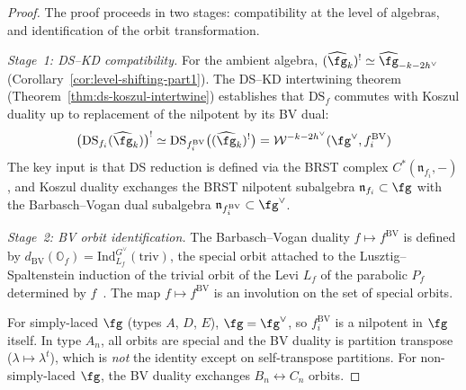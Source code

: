 \begin{proof}
The proof proceeds in two stages: compatibility at the level of
algebras, and identification of the orbit transformation.

\emph{Stage~1: DS--KD compatibility.}
For the ambient algebra,
$(\widehat{\fg}_k)^! \simeq \widehat{\fg}_{-k-2h^\vee}$
(Corollary~\ref{cor:level-shifting-part1}).  The DS--KD
intertwining theorem (Theorem~\ref{thm:ds-koszul-intertwine})
establishes that $\mathrm{DS}_f$ commutes with Koszul duality
up to replacement of the nilpotent by its BV dual:
\[
\bigl(\mathrm{DS}_{f_i}(\widehat{\fg}_k)\bigr)^!
\simeq
\mathrm{DS}_{f_i^{\mathrm{BV}}}
\bigl((\widehat{\fg}_k)^!\bigr)
= \mathcal{W}^{-k-2h^\vee}(\fg^\vee, f_i^{\mathrm{BV}})
\]
The key input is that DS reduction is defined via the BRST complex
$C^*(\mathfrak{n}_{f_i}, -)$, and Koszul duality exchanges the BRST
nilpotent subalgebra $\mathfrak{n}_{f_i} \subset \fg$ with the
Barbasch--Vogan dual subalgebra
$\mathfrak{n}_{f_i^{\mathrm{BV}}} \subset \fg^\vee$.

\emph{Stage~2: BV orbit identification.}
The Barbasch--Vogan duality
$f \mapsto f^{\mathrm{BV}}$ is defined by
$d_{\mathrm{BV}}(\mathbb{O}_f)
= \text{Ind}_{L_f}^{G^\vee}(\text{triv})$,
the special orbit attached to the Lusztig--Spaltenstein
induction of the trivial orbit of the Levi $L_f$ of the
parabolic $P_f$ determined by $f$~\cite{BV85,Achar03}.  The map
$f \mapsto f^{\mathrm{BV}}$ is an involution
on the set of special orbits.

For simply-laced $\fg$ (types $A$, $D$, $E$), $\fg = \fg^\vee$,
so $f_i^{\mathrm{BV}}$ is a nilpotent in $\fg$ itself.  In type
$A_n$, all orbits are special and the BV duality is partition
transpose ($\lambda \mapsto \lambda^t$), which is \emph{not}
the identity except on self-transpose partitions.
For non-simply-laced $\fg$, the BV duality exchanges
$B_n \leftrightarrow C_n$ orbits.
\end{proof}


